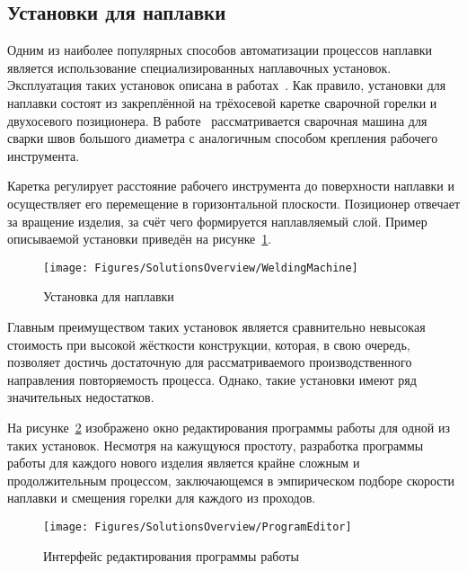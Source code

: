 \subsection{Установки для наплавки} \label{subsec:WeldingMachines}
Одним из наиболее популярных способов автоматизации процессов наплавки является использование специализированных наплавочных установок.
Эксплуатация таких установок описана в работах~\cite{Baskoro_2016, Deyong_You_2014, Jafari_2010, Su_2010, Yi_Jinggang_2010}.
Как правило, установки для наплавки состоят из закреплённой на трёхосевой каретке сварочной горелки и двухосевого позиционера.
В работе~\cite{Qi_2019} рассматривается сварочная машина для сварки швов большого диаметра с аналогичным способом крепления рабочего инструмента.

Каретка регулирует расстояние рабочего инструмента до поверхности наплавки и осуществляет его перемещение в горизонтальной плоскости.
Позиционер отвечает за вращение изделия, за счёт чего формируется наплавляемый слой.
Пример описываемой установки приведён на рисунке~\ref{fig:Overview:WeldingMachine}.

\begin{figure}[H]
    \centering
    \vspace{14pt}
    \texttt{[image: Figures/SolutionsOverview/WeldingMachine]}
    \caption{Установка для наплавки}
    \label{fig:Overview:WeldingMachine}
\end{figure}

Главным преимуществом таких установок является сравнительно невысокая стоимость при высокой жёсткости конструкции, которая, в свою очередь, позволяет достичь достаточную для рассматриваемого производственного направления повторяемость процесса.
Однако, такие установки имеют ряд значительных недостатков.

На рисунке~\ref{fig:Overview:ProgramEditor} изображено окно редактирования программы работы для одной из таких установок.
Несмотря на кажущуюся простоту, разработка программы работы для каждого нового изделия является крайне сложным и продолжительным процессом, заключающемся в эмпирическом подборе скорости наплавки и смещения горелки для каждого из проходов.

\begin{figure}[H]
    \centering
    \vspace{14pt}
    \texttt{[image: Figures/SolutionsOverview/ProgramEditor]}
    \caption{Интерфейс редактирования программы работы}
    \label{fig:Overview:ProgramEditor}
\end{figure}

